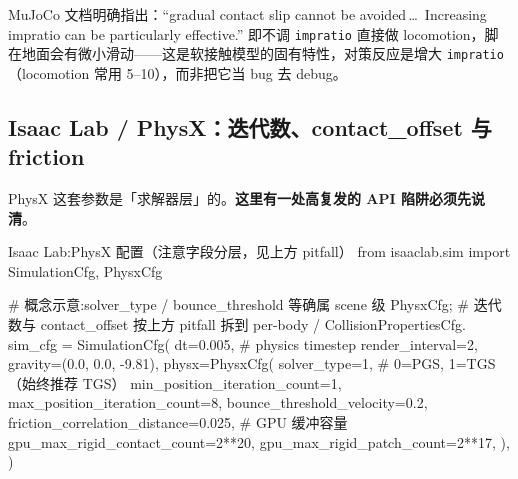 \begin{note}
MuJoCo 文档明确指出：``gradual contact slip cannot be avoided\,\dots\ Increasing impratio can be particularly effective.'' 即不调 \verb|impratio| 直接做 locomotion，脚在地面会有微小滑动——这是软接触模型的固有特性，对策反应是增大 \verb|impratio|（locomotion 常用 5--10），而非把它当 bug 去 debug。
\end{note}

\subsection{Isaac Lab / PhysX：迭代数、contact\_offset 与 friction}

PhysX 这套参数是「求解器层」的。\textbf{这里有一处高复发的 API 陷阱必须先说清}。


\begin{codebox}[Python]{Isaac Lab:PhysX 配置（注意字段分层，见上方 pitfall）}
from isaaclab.sim import SimulationCfg, PhysxCfg

# 概念示意:solver_type / bounce_threshold 等确属 scene 级 PhysxCfg;
# 迭代数与 contact_offset 按上方 pitfall 拆到 per-body / CollisionPropertiesCfg.
sim_cfg = SimulationCfg(
    dt=0.005,                       # physics timestep
    render_interval=2,
    gravity=(0.0, 0.0, -9.81),
    physx=PhysxCfg(
        solver_type=1,              # 0=PGS, 1=TGS（始终推荐 TGS）
        min_position_iteration_count=1,
        max_position_iteration_count=8,
        bounce_threshold_velocity=0.2,
        friction_correlation_distance=0.025,
        # GPU 缓冲容量
        gpu_max_rigid_contact_count=2**20,
        gpu_max_rigid_patch_count=2**17,
    ),
)
\end{codebox}

